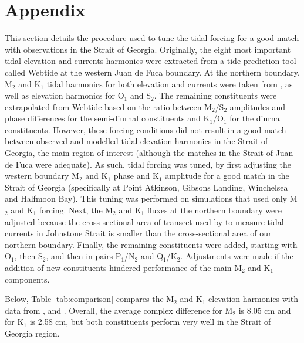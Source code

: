 \documentclass[pdftex,10pt]{article}
\begin{document}
\section{Appendix}\label{sec:appendix}
This section details the procedure used to tune the tidal forcing for a good match with observations in the Strait of Georgia. Originally, the eight most important tidal elevation and currents harmonics were extracted from a tide prediction tool called Webtide \citep{foreman2000webtide} at the western Juan de Fuca boundary. At the northern boundary,  M$_2$ and K$_1$ tidal harmonics for both elevation and currents were taken from \citet{thomson1980johnstone}, as well as elevation harmonics for O$_1$ and S$_2$. The remaining constituents were extrapolated from Webtide based on the ratio between M$_2$/S$_2$ amplitudes and phase differences for the semi-diurnal constituents and K$_1$/O$_1$ for the diurnal constituents. However, these forcing conditions did not result in a good match between observed and modelled tidal elevation harmonics in the Strait of Georgia, the main region of interest (although the matches in the Strait of Juan de Fuca were adequate). As such, tidal forcing was tuned, by first adjusting the western boundary M$_2$ and K$_1$ phase and K$_1$ amplitude for a good match in the Strait of Georgia (specifically at Point Atkinson, Gibsons Landing, Winchelsea and Halfmoon Bay). This tuning was performed on simulations that used only M$_2$ and K$_1$ forcing. Next, the M$_2$ and K$_1$ fluxes at the northern boundary were adjusted because the cross-sectional area of transect used by \citet{thomson1980johnstone} to measure tidal currents in Johnstone Strait is smaller than the cross-sectional area of our northern boundary. Finally, the remaining constituents were added, starting with O$_1$, then S$_2$, and then in pairs P$_1$/N$_2$ and Q$_1$/K$_2$. Adjustments were made if the addition of new constituents hindered performance of the main M$_2$ and K$_1$ components.

Below, Table \ref{tab:comparison} compares the M$_2$ and K$_1$ elevation harmonics with data from \citet{foreman1995tidal}, \citet{foreman2004m} and \citet{foreman2012circulation}. Overall, the average complex difference for M$_2$ is 8.05 cm and for K$_1$ is 2.58 cm, but both constituents perform very well in the Strait of Georgia region. 
\end{document}
